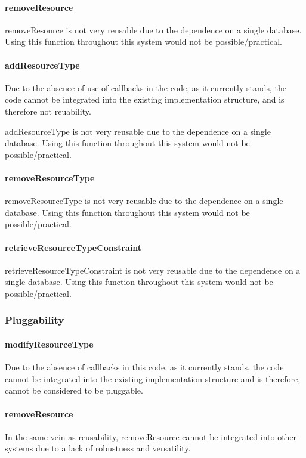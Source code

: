 \documentclass[a4paper]{article}
\begin{document}
\paragraph{removeResource}
removeResource is not very reusable due to the dependence on a single database. Using this function throughout this system would not be possible/practical.

\paragraph{addResourceType}

Due to the absence of use of callbacks in the code, as it currently stands, the code cannot be 
integrated into the existing implementation structure, and is therefore not reuability.

addResourceType is not very reusable due to the dependence on a single database. Using this function throughout this system would not be possible/practical.

\paragraph{removeResourceType}
removeResourceType is not very reusable due to the dependence on a single database. Using this function throughout this system would not be possible/practical.

\paragraph{retrieveResourceTypeConstraint}
retrieveResourceTypeConstraint is not very reusable due to the dependence on a single database. Using this function throughout this system would not be possible/practical.


\subsubsection {Pluggability}

\paragraph{modifyResourceType}
Due to the absence of callbacks in this code, as it currently stands, the code cannot be integrated into the existing implementation structure and is therefore, cannot be considered to be pluggable.

\paragraph{removeResource}
In the same vein as reusability, removeResource cannot be integrated into other systems due to a lack of robustness and versatility.
\end{document}

